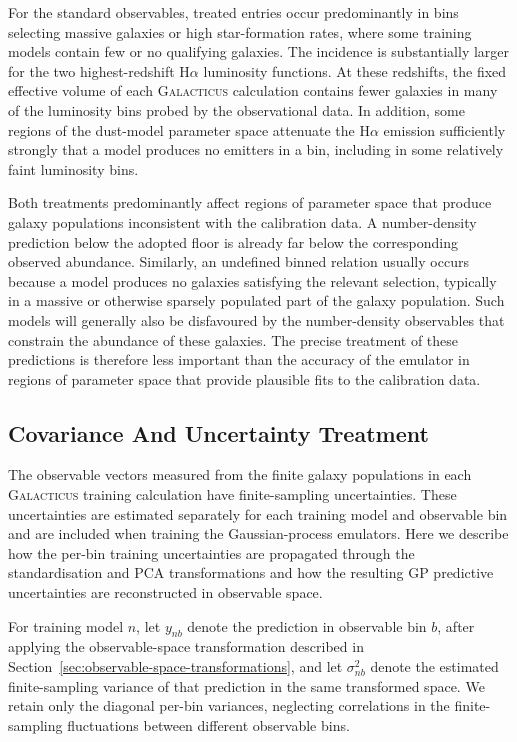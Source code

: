 \documentclass[twocolumn, apj, numberedappendix, iop]{openjournal}
\newcommand{\galacticus}{\textsc{Galacticus}\xspace}
\newcommand{\ha}{H$\alpha$}
\begin{document}
For the standard observables, treated entries occur predominantly in bins
selecting massive galaxies or high star-formation rates, where some training
models contain few or no qualifying galaxies. The incidence is substantially
larger for the two highest-redshift \ha{} luminosity functions. At these
redshifts, the fixed effective volume of each \galacticus{} calculation
contains fewer galaxies in many of the luminosity bins probed by the
observational data. In addition, some regions of the dust-model parameter
space attenuate the \ha{} emission sufficiently strongly that a model produces
no emitters in a bin, including in some relatively faint luminosity bins.

Both treatments predominantly affect regions of parameter space that produce
galaxy populations inconsistent with the calibration data. A number-density
prediction below the adopted floor is already far below the corresponding
observed abundance. Similarly, an undefined binned relation usually occurs
because a model produces no galaxies satisfying the relevant selection,
typically in a massive or otherwise sparsely populated part of the galaxy
population. Such models will generally also be disfavoured by the
number-density observables that constrain the abundance of these galaxies.
The precise treatment of these predictions is therefore less important than
the accuracy of the emulator in regions of parameter space that provide
plausible fits to the calibration data.


\subsection{Covariance And Uncertainty Treatment}
\label{app:covariance-treatment}

The observable vectors measured from the finite galaxy populations in each
\galacticus{} training calculation have finite-sampling uncertainties. These
uncertainties are estimated separately for each training model and observable
bin and are included when training the Gaussian-process emulators. Here we
describe how the per-bin training uncertainties are propagated through the
standardisation and PCA transformations and how the resulting GP predictive
uncertainties are reconstructed in observable space.

For training model \(n\), let \(y_{nb}\) denote the prediction in observable
bin \(b\), after applying the observable-space transformation described in
Section~\ref{sec:observable-space-transformations}, and let
\(\sigma_{nb}^2\) denote the estimated finite-sampling variance of that
prediction in the same transformed space. We retain only the diagonal per-bin
variances, neglecting correlations in the finite-sampling fluctuations between
different observable bins.
\end{document}
